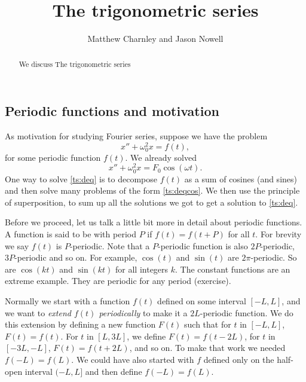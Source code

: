 \documentclass{ximera}
\title{The trigonometric series}
\author{Matthew Charnley and Jason Nowell}
\begin{document}
\begin{abstract}
    We discuss The trigonometric series
\end{abstract}
\maketitle

\label{ts:section}





\subsection{Periodic functions and motivation}

As motivation for studying Fourier series, suppose we have the problem
\begin{equation} \label{ts:deq}
    x'' + \omega_0^2 x = f(t) ,
\end{equation}
for some periodic function $f(t)$. We already solved
\begin{equation} \label{ts:deqcos}
    x'' + \omega_0^2 x = F_0 \cos ( \omega t) .
\end{equation}
One way to solve \eqref{ts:deq} is to decompose $f(t)$ as a sum of cosines (and sines) and then solve many problems of the form \eqref{ts:deqcos}.  We then use the principle of superposition, to sum up all the solutions we got to get a solution to \eqref{ts:deq}.

Before we proceed, let us talk a little bit more in detail about periodic functions. A function is said to be \emph{} with period $P$ if $f(t) = f(t+P)$ for all $t$.  For brevity we say $f(t)$ is $P$-periodic. Note that a $P$-periodic function is also $2P$-periodic, $3P$-periodic and so on. For example, $\cos (t)$ and $\sin (t)$ are $2\pi$-periodic.  So are $\cos (kt)$ and $\sin (kt)$ for all integers $k$.  The constant functions are an extreme example.  They are periodic for any period (exercise).

Normally we start with a function $f(t)$ defined on some interval $[-L,L]$, and we want to \emph{extend $f(t)$ periodically} to make it a $2L$-periodic function.  We do this extension by defining a new function $F(t)$ such that for $t$ in $[-L,L]$, $F(t) = f(t)$.  For $t$ in $[L,3L]$, we define $F(t) = f(t-2L)$, for $t$ in $[-3L,-L]$, $F(t) = f(t+2L)$, and so on. To make that work we needed $f(-L) = f(L)$. We could have also started with $f$ defined only on the half-open interval $(-L,L]$ and then define $f(-L) = f(L)$.
\end{document}
